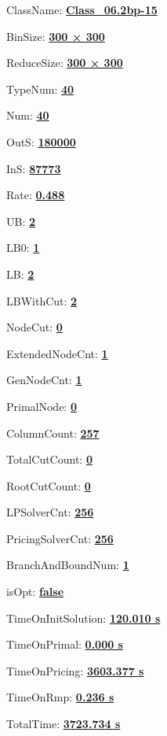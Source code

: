 \documentclass[11pt]{article}
\begin{document}
\pagestyle{empty}


ClassName: \underline{\textbf{Class_06.2bp-15}}
\par
BinSize: \underline{\textbf{300 × 300}}
\par
ReduceSize: \underline{\textbf{300 × 300}}
\par
TypeNum: \underline{\textbf{40}}
\par
Num: \underline{\textbf{40}}
\par
OutS: \underline{\textbf{180000}}
\par
InS: \underline{\textbf{87773}}
\par
Rate: \underline{\textbf{0.488}}
\par
UB: \underline{\textbf{2}}
\par
LB0: \underline{\textbf{1}}
\par
LB: \underline{\textbf{2}}
\par
LBWithCut: \underline{\textbf{2}}
\par
NodeCut: \underline{\textbf{0}}
\par
ExtendedNodeCnt: \underline{\textbf{1}}
\par
GenNodeCnt: \underline{\textbf{1}}
\par
PrimalNode: \underline{\textbf{0}}
\par
ColumnCount: \underline{\textbf{257}}
\par
TotalCutCount: \underline{\textbf{0}}
\par
RootCutCount: \underline{\textbf{0}}
\par
LPSolverCnt: \underline{\textbf{256}}
\par
PricingSolverCnt: \underline{\textbf{256}}
\par
BranchAndBoundNum: \underline{\textbf{1}}
\par
isOpt: \underline{\textbf{false}}
\par
TimeOnInitSolution: \underline{\textbf{120.010 s}}
\par
TimeOnPrimal: \underline{\textbf{0.000 s}}
\par
TimeOnPricing: \underline{\textbf{3603.377 s}}
\par
TimeOnRmp: \underline{\textbf{0.236 s}}
\par
TotalTime: \underline{\textbf{3723.734 s}}
\par
\newpage
\end{document}
